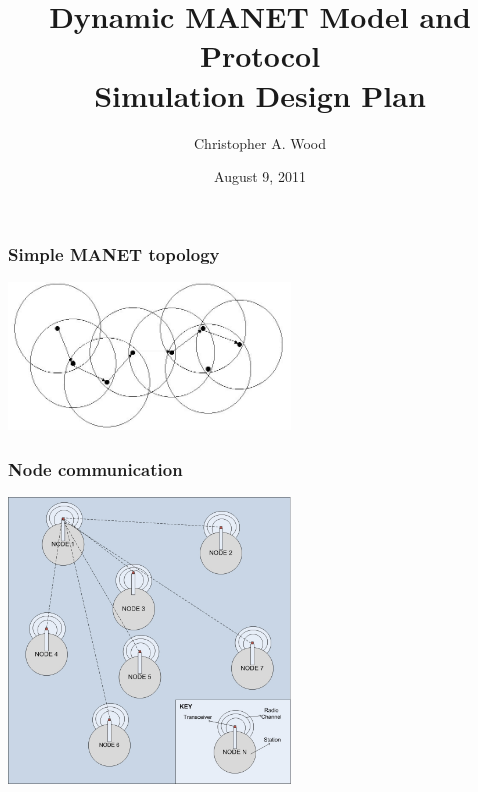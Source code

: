 \documentclass[handout]{beamer}
\title[MANET Model and Simulation Design]{Dynamic MANET Model and Protocol \\ Simulation Design Plan}
\institute[RIT]{}
\date{August 9, 2011}
\author{Christopher A. Wood}
\begin{document}
\begin{frame}
  \titlepage
  \begin{center}
	\end{center}
\end{frame}


\begin{frame}
 \frametitle{Simple MANET topology}
 \begin{center}
  \includegraphics[width=75mm]{ad_hoc_net.jpg}
 \end{center}
\end{frame}



\begin{frame}
 \frametitle{Node communication}
 \begin{center}
  \includegraphics[width=75mm]{wireless_structure.jpg}
 \end{center}
\end{frame}
\end{document}
